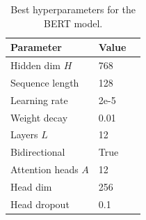 
\begin{table}[H]
\centering
\small
\begin{tabular}{lll}
\toprule
\textbf{Parameter} & \textbf{Value} \\
\midrule
Hidden dim $H$          & 768 \\
Sequence length         & 128 \\
Learning rate           & 2e-5\\
Weight decay            & 0.01\\
Layers $L$              & 12\\
Bidirectional           & True\\
Attention heads $A$     & 12  \\
Head dim                & 256 \\
Head dropout            & 0.1 \\
\bottomrule
\end{tabular}
\caption{Best hyperparameters for the BERT model.}
\label{tab:bert_hyperparameters}
\end{table}